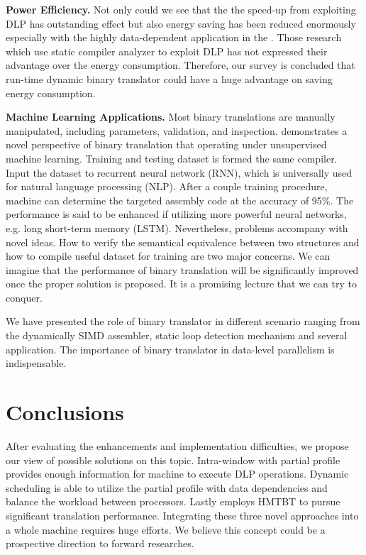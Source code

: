 \documentclass[sigconf, nonacm, natbib=false]{acmart}
\begin{document}
{\bf Power Efficiency.} Not only could we see that the the speed-up from exploiting DLP has outstanding effect but also energy saving has been reduced enormously especially with the highly data-dependent application in the \parencite{boosting_simd}. Those research \parencite{dynamic_revectorization} which use static compiler analyzer to exploit DLP has not expressed their advantage over the energy consumption. Therefore, our survey is concluded that run-time dynamic binary translator could have a huge advantage on saving energy consumption. 

{\bf Machine Learning Applications.} Most binary translations are manually manipulated, including parameters, validation, and inspection. \parencite{neural_machine} demonstrates a novel perspective of binary translation that operating under unsupervised machine learning. Training and testing dataset is formed the same compiler. Input the dataset to recurrent neural network (RNN), which is universally used for natural language processing (NLP). After a couple training procedure, machine can determine the targeted assembly code at the accuracy of 95\%. The performance is said to be enhanced if utilizing more powerful neural networks, e.g. long short-term memory (LSTM). Nevertheless, problems accompany with novel ideas. How to verify the semantical equivalence between two structures and how to compile useful dataset for training are two major concerns. We can imagine that the performance of binary translation will be significantly improved once the proper solution is proposed. It is a promising lecture that we can try to conquer. 

We have presented the role of binary translator in different scenario ranging from the dynamically SIMD assembler, static loop detection mechanism and several application. The importance of binary translator in data-level parallelism is indispensable. 

\section{Conclusions}
After evaluating the enhancements and implementation difficulties, we propose our view of possible solutions on this topic. Intra-window with partial profile provides enough information for machine to execute DLP operations. Dynamic scheduling is able to utilize the partial profile with data dependencies and balance the workload between processors. Lastly employs HMTBT to pursue significant translation performance. Integrating these three novel approaches into a whole machine requires huge efforts. We believe this concept could be a prospective direction to forward researches.
\end{document}
